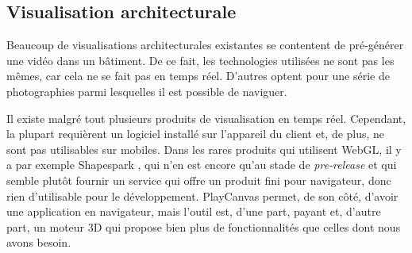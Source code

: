 \subsection{Visualisation architecturale}
Beaucoup de visualisations architecturales existantes se contentent de pré-générer une vidéo dans un bâtiment. De ce fait, les technologies utilisées ne sont pas les mêmes, car cela ne se fait pas en temps réel. D'autres optent pour une série de photographies parmi lesquelles il est possible de naviguer. 

Il existe malgré tout plusieurs produits de visualisation en temps réel. Cependant, la plupart requièrent un logiciel installé sur l'appareil du client et, de plus, ne sont pas utilisables sur mobiles. Dans les rares produits qui utilisent WebGL, il y a par exemple Shapespark \cite{architecture-shapespark}, qui n'en est encore qu'au stade de \emph{pre-release} et qui semble plutôt fournir un service qui offre un produit fini pour navigateur, donc rien d'utilisable pour le développement. PlayCanvas \cite{playcanvas-architecture} permet, de son côté, d'avoir une application en navigateur, mais l'outil est, d'une part, payant et, d'autre part, un moteur 3D qui propose bien plus de fonctionnalités que celles dont nous avons besoin.